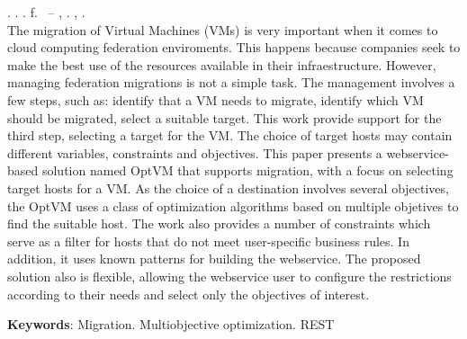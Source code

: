 \begin{resumo}[ABSTRACT]
\begin{SingleSpacing}

\imprimirautorcitacao. \imprimirtitleabstract. \imprimirdata. \pageref {LastPage} f. \imprimirprojeto\ – \imprimirprograma, \imprimirinstituicao. \imprimirlocal, \imprimirdata.\\

The migration of Virtual Machines (VMs) is very important when it comes to cloud computing federation enviroments. 
This happens because companies seek to make the best use of the resources available in their infraestructure.
However, managing federation migrations is not a simple task. The management involves a few steps, such as: 
identify that a VM needs to migrate, identify which VM 
should be migrated, select a suitable target.
This work provide support for the third step, selecting a target for the VM. 
The choice of target hosts may contain different variables, constraints and objectives. 
This paper presents a webservice-based solution named OptVM that supports migration, with a 
focus on selecting target hosts for a VM.
As the choice of a destination involves several objectives, the OptVM uses a class 
of optimization algorithms based on
multiple objetives to find the suitable host. The work also provides a number of constraints
which serve as a filter for hosts that do not meet user-specific business rules.
In addition, it uses known patterns for building the webservice.
The proposed solution also is flexible, 
allowing the webservice user to configure the restrictions according to their needs and
select only the objectives of interest.


\textbf{Keywords}: Migration. Multiobjective optimization. REST 

\end{SingleSpacing}
\end{resumo}
